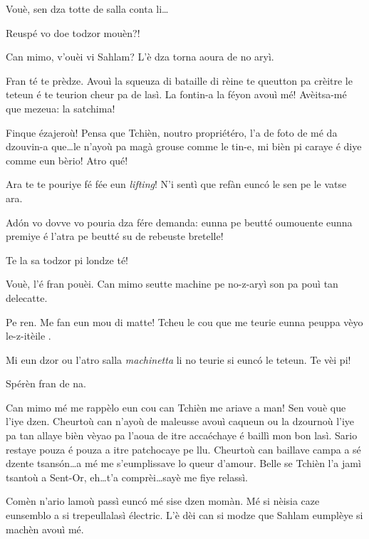 \begin{drama}
\Piccinaspeaks Vouè, sen dza totte de salla conta li\ldots

\Tzardounspeaks Reuspé vo doe todzor mouèn?!

\Cobraspeaks Can mimo, v'ouèi vi Sahlam? L’è dza torna aoura de no aryì.

\Piccinaspeaks Fran té te prèdze. Avouì la squeuza di bataille di rèine te queutton pa crèitre le teteun é te teurion cheur pa de lasì\latte. La fontin-a la féyon avouì mé!  Avèitsa-mé que mezeua: la satchima!

\Tzardounspeaks Finque ézajeroù! Pensa que Tchièn, noutro propriétéro, l’a de foto de mé da dzouvin-a que\ldots le n’ayoù pa magà grouse comme le tin-e, mi bièn pi caraye é diye comme eun bèrio! Atro qué!


\Piccinaspeaks  {} Ara te te pouriye fé fée eun \textit{lifting}! N’i sentì que refàn eunc\'o le sen pe le vatse ara.
 

\Tzardounspeaks Ad\'on vo dovve vo pouria dza fére demanda: eunna  pe beutté oumouente eunna premiye é l’atra pe beutté su de rebeuste bretelle!

\Piccinaspeaks Te la sa todzor pi londze té! 

\Tzardounspeaks Vouè, l’é fran pouèi. Can mimo seutte machine pe no-z-aryì son pa pouì tan delecatte.

\Piccinaspeaks Pe ren. Me fan eun mou di matte! Tcheu le cou que me teurie eunna peuppa vèyo le-z-itèile \stella \dolore \stella \dolore \stella .

\Tzardounspeaks Mi eun dzor ou l’atro salla \textit{machinetta} li no teurie si eunc\'o le teteun. Te vèi pi!

\Piccinaspeaks Spérèn fran de na.

\Tzardounspeaks Can mimo mé me rappèlo eun cou can Tchièn me a\-ria\-ve a man! Sen vouè que l'iye dzen. Cheurtoù can n’ayoù de maleusse avouì caqueun ou la dzournoù l'iye pa tan allaye bièn vèyao pa l’aoua de itre accaéchaye é baillì mon bon lasì. Sario restaye pouza é pouza a itre patchocaye pe llu. Cheurtoù can baillave campa a sé dzente tsans\'on\ldots a mé me s’eumplissave lo queur d’amour. Belle se Tchièn l’a jamì tsantoù a Sent-Or,  eh\ldots t’a comprèi\ldots sayè me fiye relassì.

\Piccinaspeaks Comèn n’ario lamoù passì eunc\'o mé sise dzen momàn. Mé si nèisia caze eunsemblo a si trepeullalasì électric. L’è dèi can si modze que Sahlam eumplèye si machèn avouì mé.


\end{drama}
